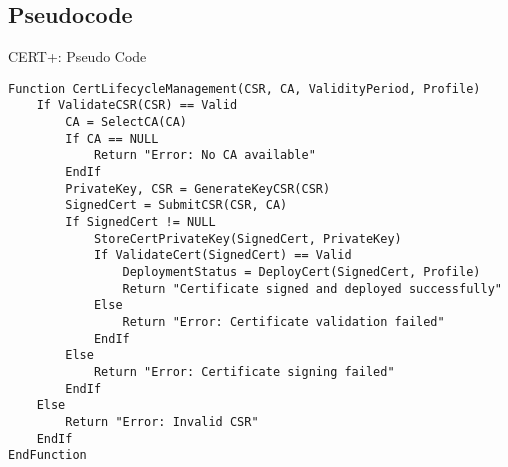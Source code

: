 \documentclass[10pt]{report}
\begin{document}
\subsection{Pseudocode}

\caption{CERT+: Pseudo Code}
\begin{verbatim}
Function CertLifecycleManagement(CSR, CA, ValidityPeriod, Profile)
    If ValidateCSR(CSR) == Valid
        CA = SelectCA(CA)
        If CA == NULL
            Return "Error: No CA available"
        EndIf
        PrivateKey, CSR = GenerateKeyCSR(CSR)
        SignedCert = SubmitCSR(CSR, CA)
        If SignedCert != NULL
            StoreCertPrivateKey(SignedCert, PrivateKey)
            If ValidateCert(SignedCert) == Valid
                DeploymentStatus = DeployCert(SignedCert, Profile)
                Return "Certificate signed and deployed successfully"
            Else
                Return "Error: Certificate validation failed"
            EndIf
        Else
            Return "Error: Certificate signing failed"
        EndIf
    Else
        Return "Error: Invalid CSR"
    EndIf
EndFunction

\end{verbatim}
\end{document}
